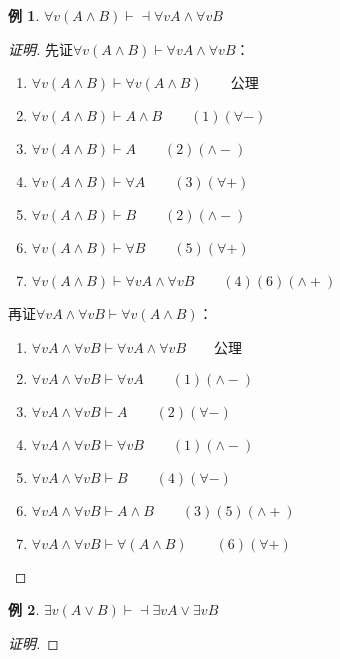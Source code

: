 \documentclass{article}
\newtheorem*{Example}{例}
\begin{document}
\begin{CJK*}{UTF8}{gbsn}
  \begin{Example}
    $\forall v(A\land B)\vdash \dashv  \forall v A\land \forall v B$
  \end{Example}
  \begin{proof}[证明]
    先证$\forall v(A\land B)\vdash  \forall v A\land \forall v B$：

    \begin{enumerate}
      \item $\forall v(A\land B)\vdash \forall v(A\land B)\qquad \text{公理}$
      \item $\forall v(A\land B)\vdash A\land B\qquad (1)(\forall -)$
      \item $\forall v(A\land B)\vdash A\qquad (2)(\land -)$
      \item $\forall v(A\land B)\vdash \forall A\qquad (3)(\forall +)$
      \item $\forall v(A\land B)\vdash B\qquad (2)(\land -)$
      \item $\forall v(A\land B)\vdash \forall B\qquad (5)(\forall +)$
      \item $\forall v(A\land B)\vdash  \forall v A\land \forall v B \qquad (4)(6)(\land +)$
    \end{enumerate}

    再证$\forall v A\land \forall v B\vdash  \forall v(A\land B)$：

    \begin{enumerate}
      \item $\forall v A\land \forall v B\vdash\forall v A\land \forall v B \qquad \text{公理}$
      \item $\forall v A\land \forall v B\vdash\forall v A \qquad (1)(\land -)$
      \item $\forall v A\land \forall v B\vdash A \qquad (2)(\forall -)$
      \item $\forall v A\land \forall v B\vdash\forall v B \qquad (1)(\land -)$
      \item $\forall v A\land \forall v B\vdash B \qquad (4)(\forall -)$
      \item $\forall v A\land \forall v B\vdash A \land B \qquad (3)(5)(\land +)$
      \item $\forall v A\land \forall v B\vdash \forall(A \land B) \qquad (6)(\forall +)$
    \end{enumerate}
  \end{proof}

  \begin{Example}
    $\exists v(A\lor B)\vdash \dashv  \exists v A\lor \exists v B$
  \end{Example}
  \begin{proof}[证明]


\end{proof}
\end{CJK*}
\end{document}
